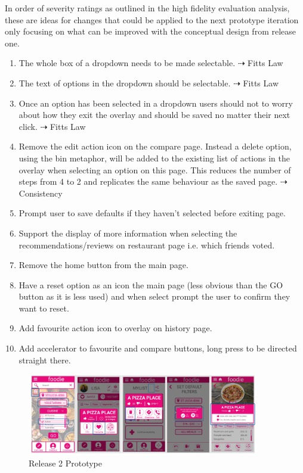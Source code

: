 \documentclass[a4 paper, 12pt]{article}
\begin{document}
In order of severity ratings as outlined in the high fidelity evaluation analysis, these are ideas for changes that could be applied to the next prototype iteration only focusing on what can be improved with the conceptual design from release one. 
\smallskip
    \begin{enumerate}[noitemsep,topsep=0pt]
        \item The whole box of a dropdown needs to be made selectable. $\dashrightarrow$ Fitts Law
        \item The text of options in the dropdown should be selectable. $\dashrightarrow$ Fitts Law
        \item Once an option has been selected in a dropdown users should not to worry about how they exit the overlay and should be saved no matter their next click. $\dashrightarrow$ Fitts Law
        \item Remove the edit action icon on the compare page. Instead a delete option, using the bin metaphor, will be added to the existing list of actions in the overlay when selecting an option on this page. This reduces the number of steps from 4 to 2 and replicates the same behaviour as the saved page. $\dashrightarrow$ Consistency
        \item Prompt user to save defaults if they haven't selected before exiting page.
        \item Support the display of more information when selecting the recommendations/reviews on restaurant page i.e. which friends voted.
        \item Remove the home button from the main page.
        \item Have a reset option as an icon the main page (less obvious than the GO button as it is less used) and when select prompt the user to confirm they want to reset.
        \item Add favourite action icon to overlay on history page.
        \item Add accelerator to favourite and compare buttons, long press to be directed straight there.        
    \end{enumerate}
    
    \begin{figure} [H]
        \centering
        \includegraphics[width=0.9\textwidth, frame]
            {./Overview/next_prototype.PNG} 
        \caption{Release 2 Prototype}
    \end{figure}  
\end{document}
